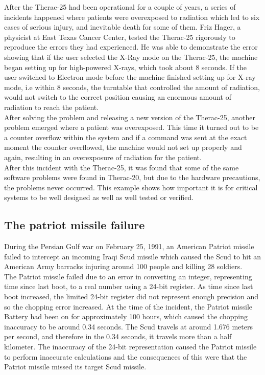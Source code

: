 After the Therac-25 had been operational for a couple of years, a series of incidents happened where patients were overexposed to radiation which led to six cases of serious injury, and inevitable death for some of them. Friz Hager, a physicist at East Texas Cancer Center, tested the Therac-25 rigorously to reproduce the errors they had experienced. He was able to demonstrate the error showing that if the user selected the X-Ray mode on the Therac-25, the machine began setting up for high-powered X-rays, which took about 8 seconds. If the user switched to Electron mode before the machine finished setting up for X-ray mode, i.e within 8 seconds, the turntable that controlled the amount of radiation, would not switch to the correct position causing an enormous amount of radiation to reach the patient.\\
After solving the problem and releasing a new version of the Therac-25, another problem emerged where a patient was overexposed. This time it turned out to be a counter overflow within the system and if a command was sent at the exact moment the counter overflowed, the machine would not set up properly and again, resulting in an overexposure of radiation for the patient. \\
After this incident with the Therac-25, it was found that some of the same software problems were found in Therac-20, but due to the hardware precautions, the problems never occurred.
This example shows how important it is for critical systems to be well designed as well as well tested or verified.

\subsection{The patriot missile failure}
During the Persian Gulf war on February 25, 1991, an American Patriot missile failed to intercept an incoming Iraqi Scud missile which caused the Scud to hit an American Army barracks injuring around 100 people and killing 28 soldiers.\\

The Patriot missile failed due to an error in converting an integer, representing time since last boot, to a real number using a 24-bit register. As time since last boot increased, the limited 24-bit register did not represent enough precision and so the chopping error increased. At the time of the incident, the Patriot missile Battery had been on for approximately 100 hours, which caused the chopping inaccuracy to be around 0.34 seconds. The Scud travels at around 1.676 meters per second, and therefore in the 0.34 seconds, it travels more than a half kilometer. The inaccuracy of the 24-bit representation caused the Patriot missile to perform inaccurate calculations and the consequences of this were that the Patriot missile missed its target Scud missile.
